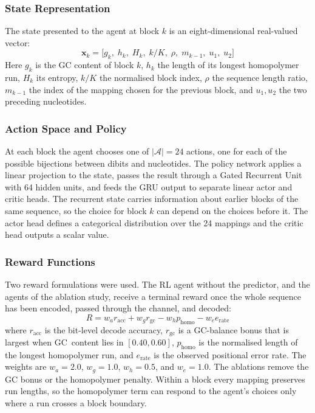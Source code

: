 \documentclass[entropy,article,submit,moreauthors]{Definitions/mdpi}
\begin{document}
\subsubsection{State Representation}

The state presented to the agent at block $k$ is an eight-dimensional real-valued vector:
\begin{equation}
    \mathbf{x}_k = \bigl[g_k,\; h_k,\; H_k,\; k/K,\; \rho,\; m_{k-1},\; u_1,\; u_2\bigr]
    \label{eq:state}
\end{equation}
Here $g_k$ is the GC content of block $k$, $h_k$ the length of its longest homopolymer run, $H_k$ its entropy, $k/K$ the normalised block index, $\rho$ the sequence length ratio, $m_{k-1}$ the index of the mapping chosen for the previous block, and $u_1, u_2$ the two preceding nucleotides.

\subsubsection{Action Space and Policy}

At each block the agent chooses one of $|\mathcal{A}| = 24$ actions, one for each of the possible bijections between dibits and nucleotides. The policy network applies a linear projection to the state, passes the result through a Gated Recurrent Unit~\cite{cho2014gru} with 64 hidden units, and feeds the GRU output to separate linear actor and critic heads. The recurrent state carries information about earlier blocks of the same sequence, so the choice for block $k$ can depend on the choices before it. The actor head defines a categorical distribution over the 24 mappings and the critic head outputs a scalar value.

\subsubsection{Reward Functions}

Two reward formulations were used. The RL agent without the predictor, and the agents of the ablation study, receive a terminal reward once the whole sequence has been encoded, passed through the channel, and decoded:
\begin{equation}
    R = w_a r_{\text{acc}} + w_g r_{\text{gc}} - w_h p_{\text{homo}} - w_e e_{\text{rate}}
    \label{eq:reward}
\end{equation}
where $r_{\text{acc}}$ is the bit-level decode accuracy, $r_{\text{gc}}$ is a GC-balance bonus that is largest when GC~content lies in $[0.40, 0.60]$, $p_{\text{homo}}$ is the normalised length of the longest homopolymer run, and $e_{\text{rate}}$ is the observed positional error rate. The weights are $w_a = 2.0$, $w_g = 1.0$, $w_h = 0.5$, and $w_e = 1.0$. The ablations remove the GC bonus or the homopolymer penalty. Within a block every mapping preserves run lengths, so the homopolymer term can respond to the agent's choices only where a run crosses a block boundary.
\end{document}
